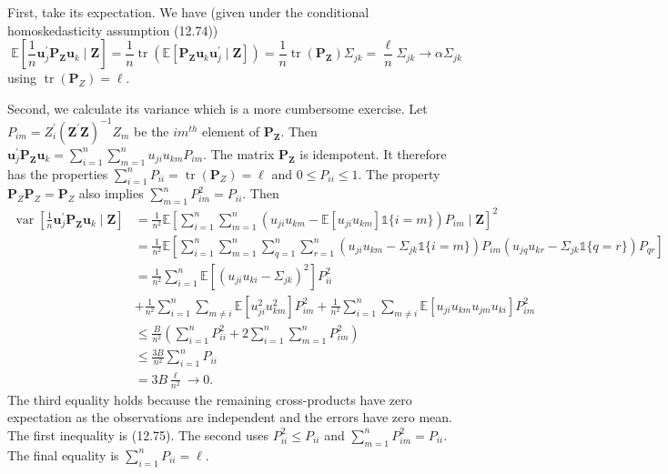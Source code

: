 \documentclass[10pt]{article}
\begin{document}
First, take its expectation. We have (given under the conditional homoskedasticity assumption (12.74))
$$
\mathbb{E}\left[\frac{1}{n} \boldsymbol{u}_{j}^{\prime} \boldsymbol{P}_{\boldsymbol{Z}} \boldsymbol{u}_{k} \mid \boldsymbol{Z}\right]=\frac{1}{n} \operatorname{tr}\left(\mathbb{E}\left[\boldsymbol{P}_{\boldsymbol{Z}} \boldsymbol{u}_{k} \boldsymbol{u}_{j}^{\prime} \mid \boldsymbol{Z}\right]\right)=\frac{1}{n} \operatorname{tr}\left(\boldsymbol{P}_{\boldsymbol{Z}}\right) \Sigma_{j k}=\frac{\ell}{n} \Sigma_{j k} \rightarrow \alpha \Sigma_{j k}
$$
using $\operatorname{tr}\left(\boldsymbol{P}_{Z}\right)=\ell$.

Second, we calculate its variance which is a more cumbersome exercise. Let $P_{i m}=Z_{i}^{\prime}\left(\boldsymbol{Z}^{\prime} \boldsymbol{Z}\right)^{-1} Z_{m}$ be the $i m^{t h}$ element of $\boldsymbol{P}_{\boldsymbol{Z}}$. Then $\boldsymbol{u}_{j}^{\prime} \boldsymbol{P}_{\boldsymbol{Z}} \boldsymbol{u}_{k}=\sum_{i=1}^{n} \sum_{m=1}^{n} u_{j i} u_{k m} P_{i m}$. The matrix $\boldsymbol{P}_{\boldsymbol{Z}}$ is idempotent. It therefore has the properties $\sum_{i=1}^{n} P_{i i}=\operatorname{tr}\left(\boldsymbol{P}_{Z}\right)=\ell$ and $0 \leq P_{i i} \leq 1$. The property $\boldsymbol{P}_{Z} \boldsymbol{P}_{Z}=\boldsymbol{P}_{Z}$ also implies $\sum_{m=1}^{n} P_{i m}^{2}=P_{i i}$. Then
$$
\begin{aligned}
\operatorname{var}\left[\frac{1}{n} \boldsymbol{u}_{j}^{\prime} \boldsymbol{P}_{\boldsymbol{Z}} \boldsymbol{u}_{k} \mid \boldsymbol{Z}\right] &=\frac{1}{n^{2}} \mathbb{E}\left[\sum_{i=1}^{n} \sum_{m=1}^{n}\left(u_{j i} u_{k m}-\mathbb{E}\left[u_{j i} u_{k m}\right] \mathbb{1}\{i=m\}\right) P_{i m} \mid \boldsymbol{Z}\right]^{2} \\
&=\frac{1}{n^{2}} \mathbb{E}\left[\sum_{i=1}^{n} \sum_{m=1}^{n} \sum_{q=1}^{n} \sum_{r=1}^{n}\left(u_{j i} u_{k m}-\Sigma_{j k} \mathbb{1}\{i=m\}\right) P_{i m}\left(u_{j q} u_{k r}-\Sigma_{j k} \mathbb{1}\{q=r\}\right) P_{q r}\right] \\
&=\frac{1}{n^{2}} \sum_{i=1}^{n} \mathbb{E}\left[\left(u_{j i} u_{k i}-\Sigma_{j k}\right)^{2}\right] P_{i i}^{2} \\
&+\frac{1}{n^{2}} \sum_{i=1}^{n} \sum_{m \neq i} \mathbb{E}\left[u_{j i}^{2} u_{k m}^{2}\right] P_{i m}^{2}+\frac{1}{n^{2}} \sum_{i=1}^{n} \sum_{m \neq i} \mathbb{E}\left[u_{j i} u_{k m} u_{j m} u_{k i}\right] P_{i m}^{2} \\
& \leq \frac{B}{n^{2}}\left(\sum_{i=1}^{n} P_{i i}^{2}+2 \sum_{i=1}^{n} \sum_{m=1}^{n} P_{i m}^{2}\right) \\
& \leq \frac{3 B}{n^{2}} \sum_{i=1}^{n} P_{i i} \\
&=3 B \frac{\ell}{n^{2}} \rightarrow 0 .
\end{aligned}
$$
The third equality holds because the remaining cross-products have zero expectation as the observations are independent and the errors have zero mean. The first inequality is (12.75). The second uses $P_{i i}^{2} \leq P_{i i}$ and $\sum_{m=1}^{n} P_{i m}^{2}=P_{i i}$. The final equality is $\sum_{i=1}^{n} P_{i i}=\ell$.
\end{document}
